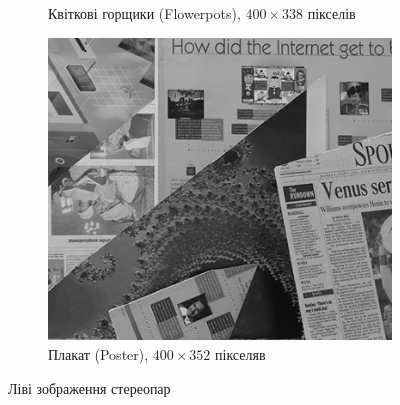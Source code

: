 \begin{figure}[h]
\begin{subfigure}[t]{0.32\textwidth}
        \caption{Квіткові горщики (Flowerpots), $400 \times 338$ пікселів}
        \label{fig:flowerpots:left}
    \end{subfigure}
    \hfill
    \begin{subfigure}[t]{0.32\textwidth}
        \centering
        \includegraphics[width=\textwidth]{images/poster_left}
        \caption{Плакат (Poster), $400 \times 352$ пікселяв}
        \label{fig:poster:left}
    \end{subfigure}
    \caption{Ліві зображення стереопар}
    \label{fig:stereopair:left}
\end{figure}


